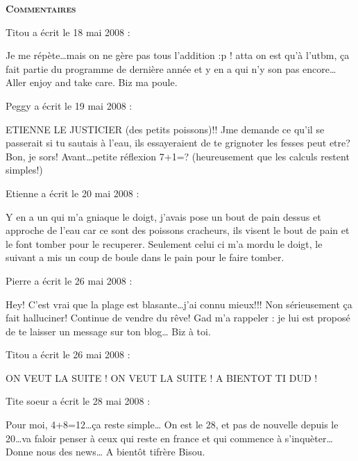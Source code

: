 \bigskip
\textbf{\textsc{Commentaires}}

\medskip
Titou a écrit le 18 mai 2008 :
\begin{displayquote}
Je me répète\dots mais on ne gère pas tous l'addition :p ! atta on est qu'à l'utbm, ça fait partie du programme de dernière année  et y en a qui n'y son pas encore\dots
Aller enjoy and take care. Biz ma poule.
\end{displayquote}

\medskip
Peggy a écrit le 19 mai 2008 :
\begin{displayquote}
ETIENNE LE JUSTICIER (des petits poissons)!!
Jme demande ce qu'il se passerait si tu sautais à l'eau, ils essayeraient de te grignoter les fesses peut etre?
Bon, je sors!
Avant\dots petite réflexion 7+1=? (heureusement que les calculs restent simples!)
\end{displayquote}

\medskip
Etienne a écrit le 20 mai 2008 :
\begin{displayquote}
Y en a un qui m'a gniaque le doigt, j'avais pose un bout de pain dessus et approche de l'eau car ce sont des poissons cracheurs, ils visent le bout de pain et le font tomber pour le recuperer. Seulement celui ci m'a mordu le doigt, le suivant a mis un coup de boule dans le pain pour le faire tomber.
\end{displayquote}

\medskip
Pierre a écrit le 26 mai 2008 :
\begin{displayquote}
Hey!
C'est vrai que la plage est blasante\dots j'ai connu mieux!!!
Non sérieusement ça fait halluciner!
Continue de vendre du rêve!
Gad m'a rappeler : je lui est proposé de te laisser un message sur ton blog\dots
Biz à toi.
\end{displayquote}

\medskip
Titou a écrit le 26 mai 2008 :
\begin{displayquote}
ON VEUT LA SUITE ! ON VEUT LA SUITE !
A BIENTOT TI DUD !
\end{displayquote}

\medskip
Tite soeur a écrit le 28 mai 2008 :
\begin{displayquote}
Pour moi, 4+8=12\dots ça reste simple\dots
On est le 28, et pas de nouvelle depuis le 20\dots va faloir penser à ceux qui reste en france et qui commence à s'inquèter\dots
Donne nous des news\dots
A bientôt tifrère
Bisou.
\end{displayquote}

\vfill

